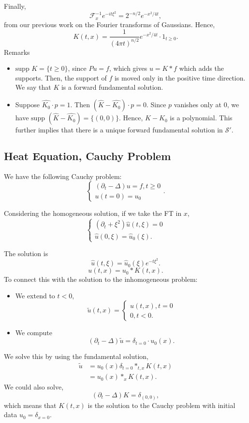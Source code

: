 \documentclass[12pt]{scrartcl}
\renewcommand{\hat}{\widehat}
\newcommand{\supp}{\text{supp }}
\begin{document}
Finally,
$$\mathcal F_x^{-1} e^{-it\xi^2} = 2^{-n/2}e^{-x^2/4t},$$
from our previous work on the Fourier transforms of Gaussians.  Hence,
$$K(t, x) = \frac{1}{(4\pi t)^{n/2}}e^{-x^2/4t} \cdot 1_{t \ge 0}.$$
Remarks
\begin{itemize}
 \item $\supp{K} = \{t \ge 0\}$, since $Pu = f$, which gives $u = K * f$ which adds the supports.  Then, the support of $f$ is moved only in the positive time direction.  We say that $K$ is a forward fundamental solution.
 \item Suppose $\hat{K_0} \cdot p = 1$.  Then $(\hat{K} - \hat{K_0})\cdot p = 0$.  Since $p$ vanishes only at $0
$, we have $\supp(\hat{K} - \hat{K_0}) = \{(0, 0)\}$.  Hence, $K - K_0$ is a polynomial.  This further implies that there is a unique forward fundamental solution in $\mathcal S'$.  
 \end{itemize} 
\subsection{Heat Equation, Cauchy Problem}
We have the following Cauchy problem:
$$\begin{cases}
(\partial_t - \Delta) u = f, t \ge 0 \\
u(t= 0) = u_0
\end{cases}.$$

Considering the homogeneous solution, if we take the FT in $x$, 
$$
\begin{cases}
(\partial_t + \xi^2) \hat{u}(t, \xi) = 0 \\
\hat{u}(0, \xi) = \hat{u}_0(\xi).
\end{cases}
$$

The solution is 
$$\hat{u}(t, \xi) = \hat{u}_0(\xi) e^{-t\xi^2}.$$
$$u(t, x) = u_0 * K(t, x).$$
To connect this with the solution to the inhomogeneous problem:
\begin{itemize}
\item We extend to $t < 0$, 
$$\tilde{u}(t, x) = \begin{cases}
u(t, x), t = 0 \\
0, t < 0.
\end{cases}$$
\item We compute 
$$(\partial_t - \Delta)\tilde{u} = \delta_{t = 0} \cdot u_0(x).$$
\end{itemize}

We solve this by using the fundamental solution,
\begin{align*}
\tilde{u} &= u_0(x) \delta_{t=0} *_{t, x} K(t, x) \\
&= u_0(x) *_x K(t, x).
\end{align*}
We could also solve,
$$(\partial_t - \Delta)K = \delta_{(0, 0)},$$
which means that $K(t, x)$ is the solution to the Cauchy problem with initial data $u_0 = \delta_{x = 0}$.
\end{document}
